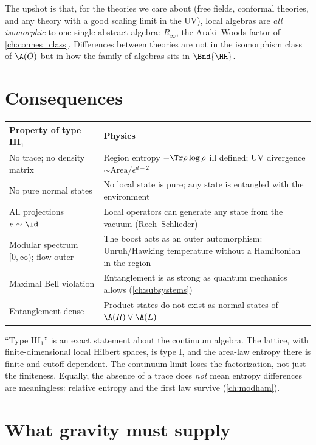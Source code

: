 The upshot is that, for the theories we care about (free fields, conformal theories, and any theory with a good scaling limit in the UV), local algebras are \emph{all isomorphic} to one single abstract algebra: $R_\infty$, the Araki--Woods factor of \cref{ch:connes_class}. Differences between theories are not in the isomorphism class of $\A(O)$ but in how the family of algebras sits in $\Bnd{\HH}$.

\section{Consequences}

\begin{center}
\renewcommand{\arraystretch}{1.3}
\begin{tabular}{@{}p{4.6cm}p{8cm}@{}}
\toprule
Property of type III$_1$ & Physics\\
\midrule
No trace; no density matrix & Region entropy $-\Tr\rho\log\rho$ ill defined; UV divergence $\sim\mathrm{Area}/\epsilon^{d-2}$\\
No pure normal states & No local state is pure; any state is entangled with the environment\\
All projections $e\sim\id$ & Local operators can generate any state from the vacuum (Reeh--Schlieder)\\
Modular spectrum $[0,\infty)$; flow outer & The boost acts as an outer automorphism: Unruh/Hawking temperature without a Hamiltonian in the region\\
Maximal Bell violation & Entanglement is as strong as quantum mechanics allows (\cref{ch:subsystems})\\
Entanglement dense & Product states do not exist as normal states of $\A(R)\vee\A(L)$\\
\bottomrule
\end{tabular}
\end{center}

\begin{whatwrong}
``Type III$_1$'' is an exact statement about the continuum algebra. The lattice, with finite-dimensional local Hilbert spaces, is type I, and the area-law entropy there is finite and cutoff dependent. The continuum limit loses the factorization, not just the finiteness. Equally, the absence of a trace does \emph{not} mean entropy differences are meaningless: relative entropy and the first law survive (\cref{ch:modham}).
\end{whatwrong}

\section{What gravity must supply}


